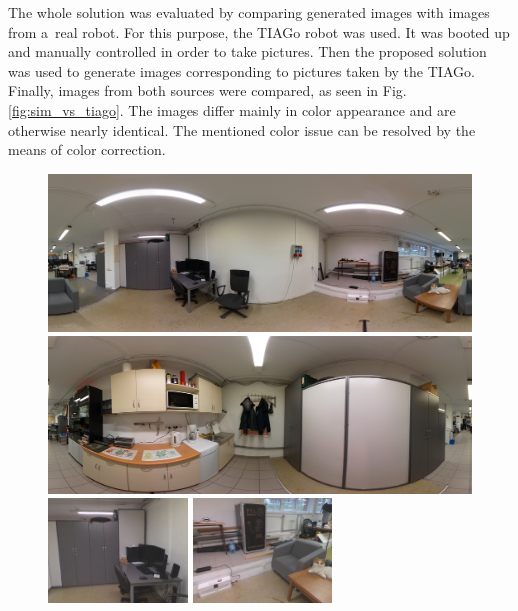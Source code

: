 \documentclass[conference]{ieeetran}
\begin{document}
The whole solution was evaluated by comparing generated images with images from a~real robot.
For this purpose, the TIAGo robot \cite{pages2016tiago} was used.
It was booted up and manually controlled in order to take pictures.
Then the proposed solution was used to generate images corresponding to pictures taken by the TIAGo.
Finally, images from both sources were compared, as seen in Fig. \ref{fig:sim_vs_tiago}. The images 
differ mainly in color appearance and are otherwise nearly identical. The mentioned color issue can 
be resolved by the means of color correction.

\begin{figure}[!p]
    \centering
    \includegraphics[width=\textwidth]{img/salon.jpg}\\\vspace{1mm}
    \includegraphics[width=\textwidth]{img/kuchnia.jpg}\\\vspace{1mm}
    \includegraphics[width=0.33\textwidth]{img/sim_vs_tiago/sim_biurko.jpg}\hfill%
    \includegraphics[width=0.33\textwidth]{img/sim_vs_tiago/sim_fotel.jpg}\hfill%

\end{figure}
\end{document}
